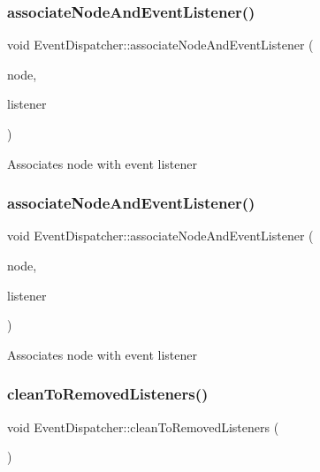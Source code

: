\subsubsection{\texorpdfstring{associate\+Node\+And\+Event\+Listener()}{associateNodeAndEventListener()}\hspace{0.1cm}{\footnotesize\ttfamily [1/2]}}
{\footnotesize\ttfamily void Event\+Dispatcher\+::associate\+Node\+And\+Event\+Listener (\begin{DoxyParamCaption}\item[{\hyperlink{classNode}{Node} $\ast$}]{node,  }\item[{\hyperlink{classEventListener}{Event\+Listener} $\ast$}]{listener }\end{DoxyParamCaption})\hspace{0.3cm}{\ttfamily [protected]}}

Associates node with event listener \mbox{\label{classEventDispatcher_ae82e15825f3fe6d5d2a32aab9214ddc0}} 
\subsubsection{\texorpdfstring{associate\+Node\+And\+Event\+Listener()}{associateNodeAndEventListener()}\hspace{0.1cm}{\footnotesize\ttfamily [2/2]}}
{\footnotesize\ttfamily void Event\+Dispatcher\+::associate\+Node\+And\+Event\+Listener (\begin{DoxyParamCaption}\item[{\hyperlink{classNode}{Node} $\ast$}]{node,  }\item[{\hyperlink{classEventListener}{Event\+Listener} $\ast$}]{listener }\end{DoxyParamCaption})\hspace{0.3cm}{\ttfamily [protected]}}

Associates node with event listener \mbox{\label{classEventDispatcher_ac4610bd51dadf12ab82b1793e26340c6}} 
\subsubsection{\texorpdfstring{clean\+To\+Removed\+Listeners()}{cleanToRemovedListeners()}\hspace{0.1cm}{\footnotesize\ttfamily [1/2]}}
{\footnotesize\ttfamily void Event\+Dispatcher\+::clean\+To\+Removed\+Listeners (\begin{DoxyParamCaption}{ }\end{DoxyParamCaption})\hspace{0.3cm}{\ttfamily [protected]}}

